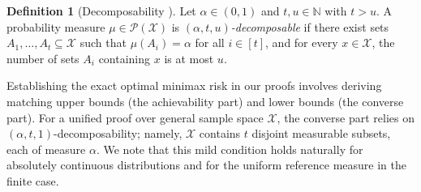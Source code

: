 \documentclass[accepted]{article}
\theoremstyle{plain} %
\theoremstyle{definition}
\newtheorem{definition}{Definition}[section]
\theoremstyle{remark}
\newcommand{\HG}[1]{\textcolor{cyan}{[#1]}}
\begin{document}
\begin{definition}[Decomposability \citep{park2024exactly}]\label{def: decomposability}
    Let $\alpha \in (0,1)$ and $t,u \in \mathbb{N}$ with $t > u$. A probability measure $\mu \in \mathcal{P}(\mathcal{X})$ is \emph{$(\alpha, t, u)$-decomposable} if there exist sets $A_1, \dots, A_t \subseteq \mathcal{X}$ such that $\mu(A_i) = \alpha$ for all $i \in [t]$, and for every $x \in \mathcal{X}$, the number of sets $A_i$ containing $x$ is at most $u$.
\end{definition}
Establishing the exact optimal minimax risk in our proofs involves deriving matching upper bounds (the achievability part) and lower bounds (the converse part). For a unified proof over general sample space $\mathcal{X}$, the converse part relies on $(\alpha, t, 1)$-decomposability; namely,  \( \mathcal{X} \) contains \( t \) disjoint measurable subsets, each of measure \( \alpha \).  We note that this mild condition holds naturally for absolutely continuous distributions and for the uniform reference measure in the finite case.
\end{document}
